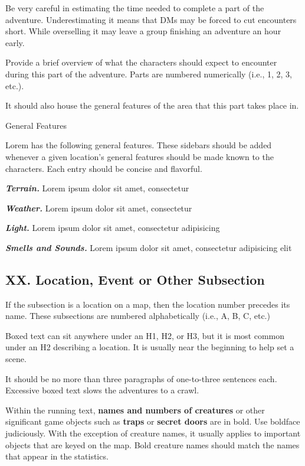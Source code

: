 Be very careful in estimating the time needed to complete a part of the
adventure. Underestimating it means that DMs may be forced to cut
encounters short. While overselling it may leave a group finishing an
adventure an hour early.

Provide a brief overview of what the characters should expect to
encounter during this part of the adventure. Parts are numbered
numerically (i.e., 1, 2, 3, etc.).

It should also house the general features of the area that this part
takes place in.

General Features

Lorem has the following general features. These sidebars should be added
whenever a given location's general features should be made known to the
characters. Each entry should be concise and flavorful.

\emph{\textbf{Terrain.}} Lorem ipsum dolor sit amet, consectetur

\emph{\textbf{Weather.}} Lorem ipsum dolor sit amet, consectetur

\emph{\textbf{Light.}} Lorem ipsum dolor sit amet, consectetur
adipisicing

\emph{\textbf{Smells and Sounds.}} Lorem ipsum dolor sit amet,
consectetur adipisicing elit

\subsection{XX. Location, Event or Other
Subsection}\label{xx.-location-event-or-other-subsection}

If the subsection is a location on a map, then the location number
precedes its name. These subsections are numbered alphabetically (i.e.,
A, B, C, etc.)

Boxed text can sit anywhere under an H1, H2, or H3, but it is most
common under an H2 describing a location. It is usually near the
beginning to help set a scene.

It should be no more than three paragraphs of one-to-three sentences
each. Excessive boxed text slows the adventures to a crawl.

Within the running text, \textbf{names and numbers of creatures} or
other significant game objects such as \textbf{traps} or \textbf{secret
doors} are in bold. Use boldface judiciously. With the exception of
creature names, it usually applies to important objects that are keyed
on the map. Bold creature names should match the names that appear in
the statistics.

